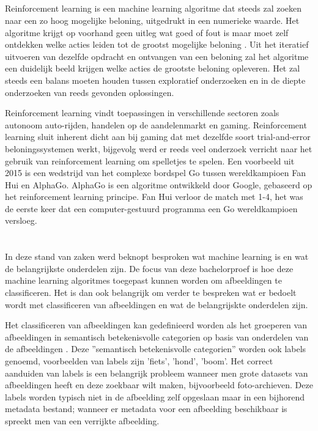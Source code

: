 \subsection{}
\label{sec:reinforcement-learning}
Reinforcement learning is een machine learning algoritme dat steeds zal zoeken naar een zo hoog mogelijke beloning, uitgedrukt in een numerieke waarde. Het algoritme krijgt op voorhand geen uitleg wat goed of fout is maar moet zelf ontdekken welke acties leiden tot de grootst mogelijke beloning \autocite{Sutton2018}. Uit het iteratief uitvoeren van dezelfde opdracht en ontvangen van een beloning zal het algoritme een duidelijk beeld krijgen welke acties de grootste beloning opleveren. Het zal steeds een balans moeten houden tussen exploratief onderzoeken en in de diepte onderzoeken van reeds gevonden oplossingen. 

Reinforcement learning vindt toepassingen in verschillende sectoren zoals autonoom auto-rijden, handelen op de aandelenmarkt en gaming. Reinforcement learning sluit inherent dicht aan bij gaming dat met dezelfde soort trial-and-error beloningssystemen werkt, bijgevolg werd er reeds veel onderzoek verricht naar het gebruik van reinforcement learning om spelletjes te spelen. Een voorbeeld uit 2015 is een wedstrijd van het complexe bordspel Go tussen wereldkampioen Fan Hui en AlphaGo. AlphaGo is een algoritme ontwikkeld door Google, gebaseerd op het reinforcement learning principe. Fan Hui verloor de match met 1-4, het was de eerste keer dat een computer-gestuurd programma een Go wereldkampioen versloeg.

\section{}
\label{sec:classificeren-van-afbeeldingen}
In deze stand van zaken werd beknopt besproken wat machine learning is en wat de belangrijkste onderdelen zijn. De focus van deze bachelorproef is hoe deze machine learning algoritmes toegepast kunnen worden om afbeeldingen te classificeren. Het is dan ook belangrijk om verder te bespreken wat er bedoelt wordt met classificeren van afbeeldingen en wat de belangrijskte onderdelen zijn.

Het classificeren van afbeeldingen kan gedefinieerd worden als het groeperen van afbeeldingen in semantisch betekenisvolle categorien op basis van onderdelen van de afbeeldingen \autocite{VAILAYA19981921}. Deze ''semantisch betekenisvolle categorien'' worden ook labels genoemd, voorbeelden van labels zijn 'fiets', 'hond', 'boom'. Het correct aanduiden van labels is een belangrijk probleem wanneer men grote datasets van afbeeldingen heeft en deze zoekbaar wilt maken, bijvoorbeeld foto-archieven. Deze labels worden typisch niet in de afbeelding zelf opgeslaan maar in een bijhorend metadata bestand; wanneer er metadata voor een afbeelding beschikbaar is spreekt men van een verrijkte afbeelding.

